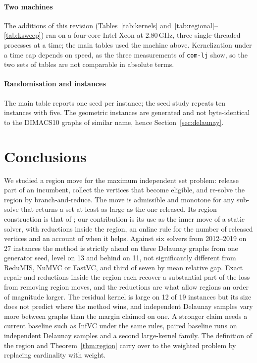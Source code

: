 \documentclass[pdflatex,sn-mathphys-num]{sn-jnl}
\theoremstyle{thmstyleone}%
\theoremstyle{thmstyletwo}%
\begin{document}
\paragraph{Two machines} The additions of this revision (Tables~\ref{tab:kernels}
and~\ref{tab:regional}--\ref{tab:ksweep}) ran on a four-core Intel Xeon at 2.80\,GHz,
three single-threaded processes at a time; the main tables used the machine above.
Kernelization under a time cap depends on speed, as the three measurements of
\texttt{com-lj} show, so the two sets of tables are not comparable in absolute terms.

\paragraph{Randomisation and instances} The main table reports one seed per instance; the
seed study repeats ten instances with five. The geometric instances are generated and not
byte-identical to the DIMACS10 graphs of similar name, hence Section~\ref{sec:delaunay}.

\section{Conclusions}
\label{sec:conclusions}

We studied a region move for the maximum independent set problem: release part of an
incumbent, collect the vertices that become eligible, and re-solve the region by
branch-and-reduce. The move is admissible and monotone for any sub-solve that returns a
set at least as large as the one released. Its region construction is that of
\citet{borowitz2025}; our contribution is its use as the inner move of a static solver,
with reductions inside the region, an online rule for the number of released vertices and
an account of when it helps. Against six solvers from 2012--2019 on 27 instances the
method is strictly ahead on three Delaunay graphs from one generator seed, level on 13 and
behind on 11, not significantly different from ReduMIS, NuMVC or FastVC, and third of
seven by mean relative gap. Exact repair and reductions inside the region each recover a
substantial part of the loss from removing region moves, and the reductions are what allow
regions an order of magnitude larger. The residual kernel is large on 12 of 19 instances
but its size does not predict where the method wins, and independent Delaunay samples vary
more between graphs than the margin claimed on one. A stronger claim needs a current
baseline such as InfVC under the same rules, paired baseline runs on independent Delaunay
samples and a second large-kernel family. The definition of the region and
Theorem~\ref{thm:region} carry over to the weighted problem by replacing cardinality with
weight.
\end{document}
